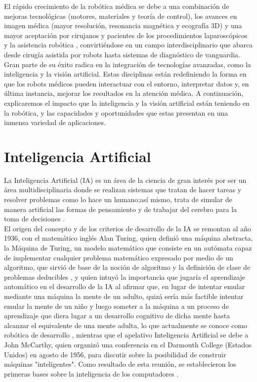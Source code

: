 El rápido crecimiento de la robótica médica se debe a una combinación de mejoras tecnológicas (motores, materiales y teoría de control), los avances en imagen médica (mayor resolución, resonancia magnética y ecografía 3D) y una mayor aceptación por cirujanos y pacientes de los procedimientos laparoscópicos y la asistencia robótica \cite{Beasley12}, convirtiéndose en un campo interdisciplinario que abarca desde cirugía asistida por robots hasta sistemas de diagnóstico de vanguardia. Gran parte de su éxito radica en la integración de tecnologías avanzadas, como la inteligencia y la visión artificial. Estas disciplinas están redefiniendo la forma en que los robots médicos pueden interactuar con el entorno, interpretar datos y, en última instancia, mejorar los resultados en la atención médica. A continuación, explicaremos el impacto que la inteligencia y la visión artificial están teniendo en la robótica, y las capacidades y oportunidades que estas presentan en una inmensa variedad de aplicaciones.

\pagebreak

\section{Inteligencia Artificial}
\label{sec:IA} 

La Inteligencia Artificial (IA) es un área de la ciencia de gran interés por ser un área multidisciplinaria donde se realizan sistemas que tratan de hacer tareas y resolver problemas como lo hace un humano;así mismo, trata de simular de manera artificial las formas de pensamiento y de trabajar del cerebro para la toma de decisiones \cite{Ponce14}.\\

El origen del concepto y de los criterios de desarrollo de la IA se remontan al año 1936, con el matemático inglés Alan Turing, quien definió una máquina abstracta, la Máquina de Turing, un modelo matemático que consiste en un autómata capaz de implementar cualquier problema matemático expresado por medio de un algoritmo, que sirvió de base de la noción de algoritmo y la definición de clase de problemas deducibles \cite{Hardy01}, y quien intuyó la importancia que jugaría el aprendizaje automático en el desarrollo de la IA al afirmar que, en lugar de intentar emular mediante una máquina la mente de un adulto, quizá sería más factible intentar emular la mente de un niño y luego someter a la máquina a un proceso de aprendizaje que diera lugar a un desarrollo cognitivo de dicha mente hasta alcanzar el equivalente de una mente adulta, lo que actualmente se conoce como robótica de desarrollo \cite{Gonzalez17}, mientras que el apelativo Inteligencia Artificial se debe a John McCarthy, quien organizó una conferencia en el Darmouth College (Estados Unidos) en agosto de 1956, para discutir sobre la posibilidad de construir máquinas "inteligentes". Como resultado de esta reunión, se establecieron los primeras bases sobre la inteligencia de los computadores \cite{Ponce14}. \\

